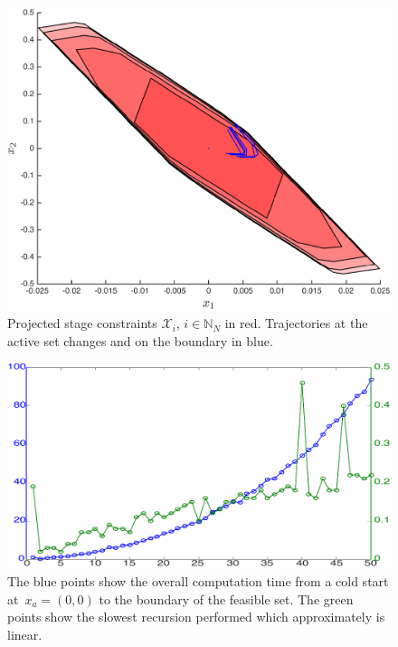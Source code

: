 \documentclass[journal]{IEEEtran}
\theoremstyle{remark}
\theoremstyle{definition}
\begin{document}
\begin{figure}
\centering
\includegraphics[width=\columnwidth]{myplot}
\caption{Projected stage constraints $\mathcal X_i$, $i\in\mathbb N_N$
in red. Trajectories
at the active set changes and on the boundary in blue.}
\label{fig:plot}
\end{figure}

\begin{figure}
\centering
\includegraphics[width=\columnwidth]{ComputationTimes.pdf}
\caption{The \textcolor[rgb]{0,0,1}{blue points} show the overall computation time from a cold start 
at~$x_a=(0,0)$ to the boundary of the feasible set. The \textcolor[rgb]{0,.6,0}{green points} show the slowest recursion
performed which approximately is linear.}
\label{fig:computation:times}
\end{figure}


\end{document}
